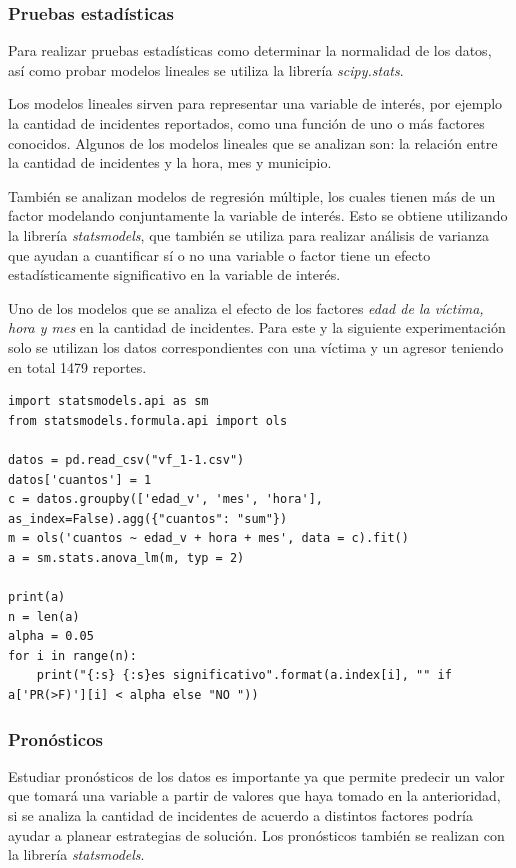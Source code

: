 \documentclass[final,5p,times]{elsarticle}
\begin{document}
\subsubsection*{Pruebas estad\'isticas}

Para realizar pruebas estad\'isticas como determinar la normalidad de los datos, as\'i como probar modelos lineales se utiliza la librer\'ia \textit{scipy.stats}. 

Los modelos lineales sirven para representar una variable de inter\'es, por ejemplo la cantidad de incidentes reportados, como una función de uno o m\'as factores conocidos. Algunos de los modelos lineales que se analizan son: la relaci\'on entre la cantidad de incidentes y la hora, mes y municipio.

Tambi\'en se analizan modelos de regresi\'on m\'ultiple, los cuales tienen m\'as de un factor modelando conjuntamente la variable de inter\'es. Esto se obtiene utilizando la librer\'ia \textit{statsmodels}, que tambi\'en se utiliza para realizar an\'alisis de varianza que ayudan a cuantificar s\'i o no una variable o factor tiene un efecto estad\'isticamente significativo en la variable de inter\'es.

Uno de los modelos que se analiza el efecto de los factores \textit{edad de la v\'ictima, hora y mes} en la cantidad de incidentes. Para este y la siguiente experimentaci\'on solo se utilizan los datos correspondientes con una v\'ictima y un agresor teniendo en total 1479 reportes.
\begin{lstlisting}
import statsmodels.api as sm
from statsmodels.formula.api import ols

datos = pd.read_csv("vf_1-1.csv") 
datos['cuantos'] = 1
c = datos.groupby(['edad_v', 'mes', 'hora'], as_index=False).agg({"cuantos": "sum"})
m = ols('cuantos ~ edad_v + hora + mes', data = c).fit() 
a = sm.stats.anova_lm(m, typ = 2)

print(a)
n = len(a)
alpha = 0.05
for i in range(n):
    print("{:s} {:s}es significativo".format(a.index[i], "" if a['PR(>F)'][i] < alpha else "NO ")) 
\end{lstlisting}

\subsubsection*{Pron\'osticos}

Estudiar pron\'osticos de los datos es importante ya que permite predecir un valor que tomar\'a una variable a partir de valores que haya tomado en la anterioridad, si se analiza la cantidad de incidentes de acuerdo a distintos factores podr\'ia ayudar a planear estrategias de soluci\'on. Los pron\'osticos tambi\'en se realizan con la librer\'ia \textit{statsmodels}.
\end{document}

